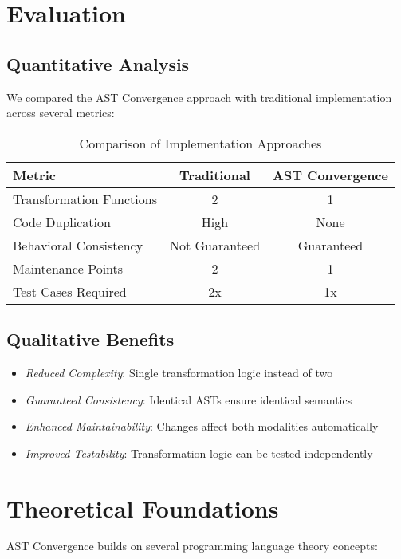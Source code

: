\documentclass[conference]{IEEEtran}
\begin{document}
\section{Evaluation}

\subsection{Quantitative Analysis}

We compared the AST Convergence approach with traditional implementation across several metrics:

\begin{table}[htbp]
\centering
\caption{Comparison of Implementation Approaches}
\label{tab:comparison}
\begin{tabular}{lcc}
\toprule
\textbf{Metric} & \textbf{Traditional} & \textbf{AST Convergence} \\
\midrule
Transformation Functions & 2 & 1 \\
Code Duplication & High & None \\
Behavioral Consistency & Not Guaranteed & Guaranteed \\
Maintenance Points & 2 & 1 \\
Test Cases Required & 2x & 1x \\
\bottomrule
\end{tabular}
\end{table}

\subsection{Qualitative Benefits}

\begin{itemize}
\item \emph{Reduced Complexity}: Single transformation logic instead of two
\item \emph{Guaranteed Consistency}: Identical ASTs ensure identical semantics
\item \emph{Enhanced Maintainability}: Changes affect both modalities automatically
\item \emph{Improved Testability}: Transformation logic can be tested independently
\end{itemize}

\section{Theoretical Foundations}

AST Convergence builds on several programming language theory concepts:
\end{document}
